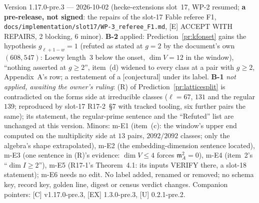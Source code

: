 \documentclass[11pt]{article}
\theoremstyle{remark}
\newcommand{\m}{\mathfrak{m}}
\newcommand{\CONJ}{\textsf{[conjectural]}}
\begin{document}
Version 1.17.0-pre.3 --- 2026-10-02 (hecke-extensions slot~17, WP-2 resumed; \textbf{a pre-release, not signed}: the repairs of the slot-17 Fable
referee F1, \texttt{docs/implementation/slot17/WP-3\_referee\_F1.md}, [E] ACCEPT WITH REPAIRS, 2 blocking, 6 minor). \textbf{B-2} applied: Prediction~\ref{pr:kfonset}
gains the hypothesis $g_{\ell+1-w}=1$ (refuted as stated at $g=2$ by the document's own $(608,547)$: Loewy length~$3$ below the onset, $\dim V=12$ in the window),
``nothing asserted at $g\ge2$'', item~(d) widened to every class at a pair with $g\ge2$, Appendix~A's row; a restatement of a \CONJ{} under its label.
\textbf{B-1} \emph{not applied, awaiting the owner's ruling}: (R) of Prediction~\ref{pr:latticesplit} is contradicted on the forms side at irreducible classes
($\ell=67$, $131$ and the regular $139$; reproduced by slot-17 R17-2~\S7 with tracked tooling, six further pairs the same); its statement, the regular-prime sentence
and the ``Refuted'' list are unchanged at this version. Minors: m-E1 (item~(c): the window's upper end computed on the multiplicity side at $13$ pairs, $2092/2092$
classes; only the algebra's shape extrapolated), m-E2 (the embedding-dimension sentence located), m-E3 (one sentence in (R)'s evidence: $\dim V\le4$ forces
$\m_A^2=0$), m-E4 (item~2's ``$\dim I\ge2$''), m-E5 (R17-1's Theorem~4.1: its inputs VERIFY there, a slot-18 statement); m-E6 needs no edit. No label added,
renamed or removed; no schema key, record key, golden line, digest or census verdict changes. Companion pointers: [C] v1.17.0-pre.3, [EX] 1.3.0-pre.3, [U]
0.2.1-pre.2.
\end{document}
